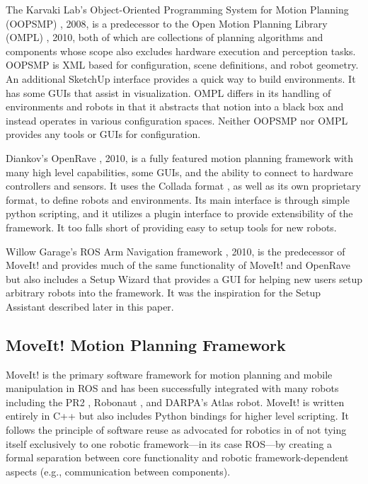 \documentclass[10pt,journal,compsoc]{joser1}
\begin{document}
{The Karvaki Lab's Object-Oriented Programming System for Motion Planning (OOPSMP) \cite{oopsmp}, 2008, is a predecessor to the Open Motion Planning Library (OMPL) \cite{sucan2012the-open-motion-planning-library}, 2010, both of which are collections of planning algorithms and components whose scope also excludes hardware execution and perception tasks. OOPSMP is XML based for configuration, scene definitions, and robot geometry. An additional SketchUp interface provides a quick way to build environments. It has some GUIs that assist in visualization. OMPL differs in its handling of environments and robots in that it abstracts that notion into a black box and instead operates in various configuration spaces. Neither OOPSMP nor OMPL provides any tools or GUIs for configuration.

Diankov's OpenRave \cite{diankov2008openrave}, 2010, is a fully featured motion planning framework with many high level capabilities, some GUIs, and the ability to connect to hardware controllers and sensors. It uses the Collada format \cite{collada}, as well as its own proprietary format, to define robots and environments. Its main interface is through simple python scripting, and it utilizes a plugin interface to provide extensibility of the framework. It too falls short of providing easy to setup tools for new robots. 

Willow Garage's ROS Arm Navigation framework \cite{chitta2012perception}, 2010, is the predecessor of MoveIt! and provides much of the same functionality of MoveIt! and OpenRave but also includes a Setup Wizard that provides a GUI for helping new users setup arbitrary robots into the framework. It was the inspiration for the Setup Assistant described later in this paper.
\subsection{MoveIt! Motion Planning Framework}
\label{sec::moveit}

MoveIt!\cite{moveit} is the primary software framework for motion planning and mobile manipulation in ROS and has been successfully integrated with many robots including the PR2 \cite{wyrobek2008towards}, Robonaut \cite{ambrose2000robonaut}, and DARPA's Atlas robot. MoveIt! is written entirely in C++ but also includes Python bindings for higher level scripting. It follows the principle of software reuse as advocated for robotics in \cite{makarenko2007benefits} of not tying itself exclusively to one robotic framework---in its case ROS---by creating a formal separation between core functionality and robotic framework-dependent aspects (e.g., communication between components).

}
\end{document}
